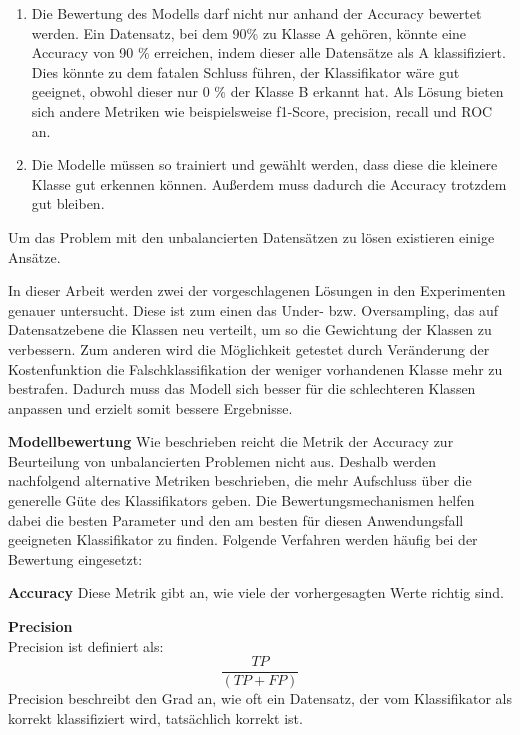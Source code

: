 \begin{enumerate}
 \item Die Bewertung des Modells darf nicht nur anhand der Accuracy bewertet werden. Ein Datensatz, bei dem 90\% zu Klasse A gehören, könnte eine Accuracy von 90 \% erreichen, indem dieser alle Datensätze als A klassifiziert. Dies könnte zu dem fatalen Schluss führen, der Klassifikator wäre gut geeignet, obwohl dieser nur 0 \% der Klasse B erkannt hat. Als Lösung bieten sich andere Metriken wie beispielsweise f1-Score, precision, recall und ROC an.  
 \item Die Modelle müssen so trainiert und gewählt werden, dass diese die kleinere Klasse gut erkennen können. Außerdem muss dadurch die Accuracy trotzdem gut bleiben. 
\end{enumerate}  \cite{Chapter 2 Foundations on Imbalanced Classification von Fernandez} 

Um das Problem mit den unbalancierten Datensätzen zu lösen existieren einige Ansätze. 
\cite{Chapter 2 Foundations on Imbalanced Classification von Fernandez} 

In dieser Arbeit werden zwei der vorgeschlagenen Lösungen in den Experimenten genauer untersucht. 
Diese ist zum einen das Under- bzw. Oversampling, das auf Datensatzebene die Klassen neu verteilt, um so die Gewichtung der Klassen zu verbessern. 
Zum anderen wird die Möglichkeit getestet durch Veränderung der Kostenfunktion die Falschklassifikation der weniger vorhandenen Klasse mehr zu bestrafen. 
Dadurch muss das Modell sich besser für die schlechteren Klassen anpassen und erzielt somit bessere Ergebnisse. 
\cite{Chapter 2 Foundations on Imbalanced Classification von Fernandez} 


\textbf{Modellbewertung}
Wie beschrieben reicht die Metrik der Accuracy zur Beurteilung von unbalancierten Problemen nicht aus.
Deshalb werden nachfolgend alternative Metriken beschrieben, die mehr Aufschluss über die generelle Güte des Klassifikators geben. 
Die Bewertungsmechanismen helfen dabei die besten Parameter und den am besten für diesen Anwendungsfall geeigneten Klassifikator zu finden.
Folgende Verfahren werden häufig bei der Bewertung eingesetzt:

\textbf{Accuracy}
Diese Metrik gibt an, wie viele der vorhergesagten Werte richtig sind. %


\textbf{Precision} \cite{Fundamentals of ML Kapitel 8.4.2.2} \\
Precision ist definiert als: \\
\begin{equation}
 \frac{TP}{(TP+FP)}
\end{equation}
Precision beschreibt den Grad an, wie oft ein Datensatz, der vom Klassifikator als korrekt klassifiziert wird, tatsächlich korrekt ist. 

